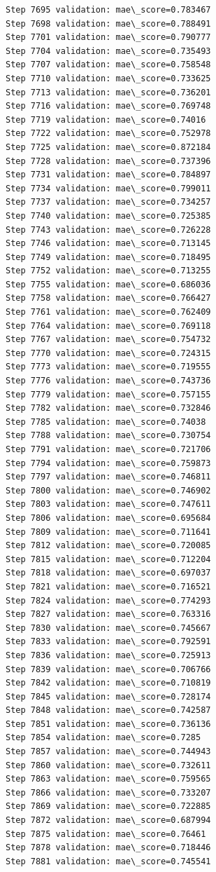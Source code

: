 \documentclass[11pt]{article}
\begin{document}
\begin{Verbatim}[commandchars=\\\{\}]
Step 7695 validation: mae\_score=0.783467
Step 7698 validation: mae\_score=0.788491
Step 7701 validation: mae\_score=0.790777
Step 7704 validation: mae\_score=0.735493
Step 7707 validation: mae\_score=0.758548
Step 7710 validation: mae\_score=0.733625
Step 7713 validation: mae\_score=0.736201
Step 7716 validation: mae\_score=0.769748
Step 7719 validation: mae\_score=0.74016
Step 7722 validation: mae\_score=0.752978
Step 7725 validation: mae\_score=0.872184
Step 7728 validation: mae\_score=0.737396
Step 7731 validation: mae\_score=0.784897
Step 7734 validation: mae\_score=0.799011
Step 7737 validation: mae\_score=0.734257
Step 7740 validation: mae\_score=0.725385
Step 7743 validation: mae\_score=0.726228
Step 7746 validation: mae\_score=0.713145
Step 7749 validation: mae\_score=0.718495
Step 7752 validation: mae\_score=0.713255
Step 7755 validation: mae\_score=0.686036
Step 7758 validation: mae\_score=0.766427
Step 7761 validation: mae\_score=0.762409
Step 7764 validation: mae\_score=0.769118
Step 7767 validation: mae\_score=0.754732
Step 7770 validation: mae\_score=0.724315
Step 7773 validation: mae\_score=0.719555
Step 7776 validation: mae\_score=0.743736
Step 7779 validation: mae\_score=0.757155
Step 7782 validation: mae\_score=0.732846
Step 7785 validation: mae\_score=0.74038
Step 7788 validation: mae\_score=0.730754
Step 7791 validation: mae\_score=0.721706
Step 7794 validation: mae\_score=0.759873
Step 7797 validation: mae\_score=0.746811
Step 7800 validation: mae\_score=0.746902
Step 7803 validation: mae\_score=0.747611
Step 7806 validation: mae\_score=0.695684
Step 7809 validation: mae\_score=0.711641
Step 7812 validation: mae\_score=0.720085
Step 7815 validation: mae\_score=0.712204
Step 7818 validation: mae\_score=0.697037
Step 7821 validation: mae\_score=0.716521
Step 7824 validation: mae\_score=0.774293
Step 7827 validation: mae\_score=0.763316
Step 7830 validation: mae\_score=0.745667
Step 7833 validation: mae\_score=0.792591
Step 7836 validation: mae\_score=0.725913
Step 7839 validation: mae\_score=0.706766
Step 7842 validation: mae\_score=0.710819
Step 7845 validation: mae\_score=0.728174
Step 7848 validation: mae\_score=0.742587
Step 7851 validation: mae\_score=0.736136
Step 7854 validation: mae\_score=0.7285
Step 7857 validation: mae\_score=0.744943
Step 7860 validation: mae\_score=0.732611
Step 7863 validation: mae\_score=0.759565
Step 7866 validation: mae\_score=0.733207
Step 7869 validation: mae\_score=0.722885
Step 7872 validation: mae\_score=0.687994
Step 7875 validation: mae\_score=0.76461
Step 7878 validation: mae\_score=0.718446
Step 7881 validation: mae\_score=0.745541

\end{Verbatim}
\end{document}
